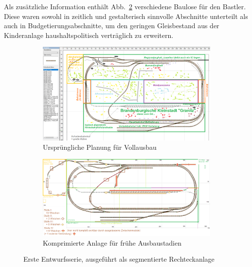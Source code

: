 Als zus\"atzliche Information enth\"alt Abb.~\ref{img:state0-1_granitz_modules_compressed} verschiedene Baulose f\"ur den Bastler.
Diese waren sowohl in zeitlich und gestalterisch sinnvolle Abschnitte unterteilt als auch in Budgetierungsabschnitte, um den geringen Gleisbestand aus der Kinderanlage haushaltspolitisch vertr\"aglich zu erweitern.

\begin{figure}[h]
\centering
	\begin{subfigure}[b]{1.0\textwidth}
    \includegraphics[width=1.0\textwidth]{img/map_evolution/state0-1_granitz_modules_details.png}
   \caption{Urspr\"ungliche Planung f\"ur Vollausbau}
    \label{img:state0-1_granitz_modules_details}
    \end{subfigure}
	\begin{subfigure}[b]{1.0\textwidth}
    \includegraphics[width=1.0\textwidth]{img/map_evolution/state0-1_granitz_modules_compressed.png}
   \caption{Komprimierte Anlage f\"ur fr\"uhe Ausbaustadien}
    \label{img:state0-1_granitz_modules_compressed}
    \end{subfigure}
	\caption{Erste Entwurfsserie, ausgef\"uhrt als segmentierte Rechteckanlage}
	\label{img:state0-1_granitz}
\end{figure}

